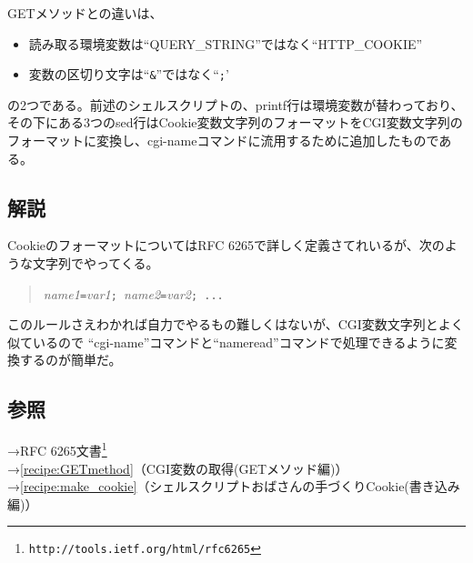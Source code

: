 GETメソッドとの違いは、
\begin{itemize}
  \item 読み取る環境変数は``QUERY\_{}STRING''ではなく``HTTP\_{}COOKIE''
  \item 変数の区切り文字は``\verb|&|''ではなく``\verb|;|'
\end{itemize}
の2つである。前述のシェルスクリプトの、printf行は環境変数が替わっており、その下にある3つのsed行はCookie変数文字列のフォーマットをCGI変数文字列のフォーマットに変換し、cgi-nameコマンドに流用するために追加したものである。

\subsection*{解説}

CookieのフォーマットについてはRFC 6265で詳しく定義さてれいるが、次のような文字列でやってくる。
\begin{quote}
	\textit{name1}\verb|=|\textit{var1}\verb|; |\textit{name2}\verb|=|\textit{var2}\verb|; ...|
\end{quote}

このルールさえわかれば自力でやるもの難しくはないが、CGI変数文字列とよく似ているので
``cgi-name''コマンドと``nameread''コマンドで処理できるように変換するのが簡単だ。

\subsection*{参照}

\noindent
→RFC 6265文書\footnote{\verb|http://tools.ietf.org/html/rfc6265|} \\
→\ref{recipe:GETmethod}（CGI変数の取得(GETメソッド編)） \\
→\ref{recipe:make_cookie}（シェルスクリプトおばさんの手づくりCookie(書き込み編)）
